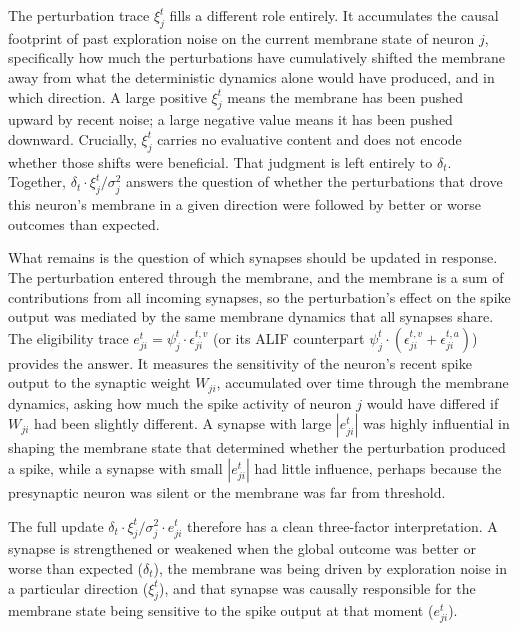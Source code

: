     The perturbation trace $\xi_j^t$ fills a different role entirely.
    It accumulates the causal footprint of past exploration noise on the current
    membrane state of neuron $j$, specifically how much the perturbations have
    cumulatively shifted the membrane away from what the deterministic dynamics
    alone would have produced, and in which direction.
    A large positive $\xi_j^t$ means the membrane has been pushed upward by
    recent noise; a large negative value means it has been pushed downward.
    Crucially, $\xi_j^t$ carries no evaluative content and does not encode whether
    those shifts were beneficial.
    That judgment is left entirely to $\delta_t$.
    Together, $\delta_t \cdot \xi_j^t / \sigma_j^2$ answers the question of whether
    the perturbations that drove this neuron's membrane in a given direction were
    followed by better or worse outcomes than expected.
    
    What remains is the question of which synapses should be updated in response.
    The perturbation entered through the membrane, and the membrane is a sum of
    contributions from all incoming synapses, so the perturbation's effect on the
    spike output was mediated by the same membrane dynamics that all synapses share.
    The eligibility trace $e_{ji}^t = \psi_j^t \cdot \epsilon_{ji}^{t,v}$ (or
    its ALIF counterpart $\psi_j^t \cdot (\epsilon_{ji}^{t,v} +
    \epsilon_{ji}^{t,a})$) provides the answer.
    It measures the sensitivity of the neuron's recent spike output to the
    synaptic weight $W_{ji}$, accumulated over time through the membrane dynamics,
    asking how much the spike activity of neuron $j$ would have differed if
    $W_{ji}$ had been slightly different.
    A synapse with large $|e_{ji}^t|$ was highly influential in shaping the
    membrane state that determined whether the perturbation produced a spike, while
    a synapse with small $|e_{ji}^t|$ had little influence, perhaps because the
    presynaptic neuron was silent or the membrane was far from threshold.
    
    The full update $\delta_t \cdot \xi_j^t / \sigma_j^2 \cdot e_{ji}^t$
    therefore has a clean three-factor interpretation. A synapse is strengthened
    or weakened when the global outcome was better or worse than expected
    ($\delta_t$), the membrane was being driven by exploration noise in a
    particular direction ($\xi_j^t$), and that synapse was causally responsible
    for the membrane state being sensitive to the spike output at that moment
    ($e_{ji}^t$).
   
